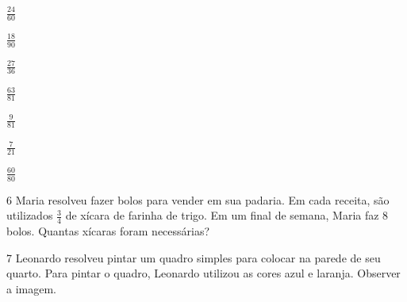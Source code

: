 \begin{escolha}
\item $\frac{24}{60}$ \\

\item $\frac{18}{90}$ \\

\item $\frac{27}{36}$ \\

\item $\frac{63}{81}$ \\

\item $\frac{9}{81}$ \\

\item $\frac{7}{21}$ \\

\item $\frac{60}{80}$ \\

\end{escolha}

\num{6}  Maria resolveu fazer bolos para vender em sua padaria. Em cada
receita, são utilizados $\frac{3}{4}$ de xícara de farinha de trigo. Em um final
de semana, Maria faz $8$ bolos. Quantas xícaras foram necessárias?







\num{7}  Leonardo resolveu pintar um quadro simples para colocar na parede de
seu quarto. Para pintar o quadro, Leonardo utilizou as cores azul e laranja.
Observer a imagem.

